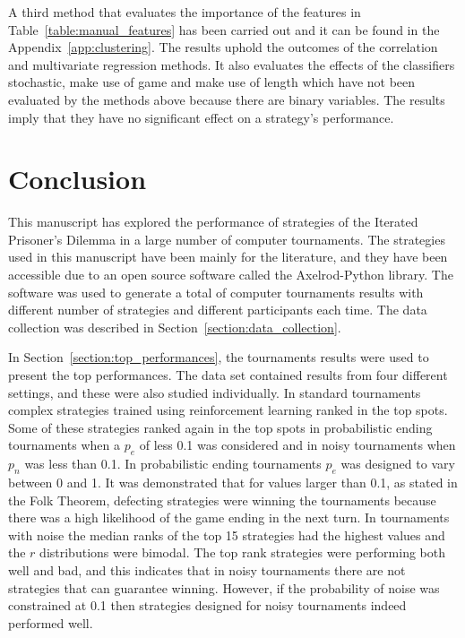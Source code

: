 \documentclass{article}
\newcommand{\numberofalltournaments}{}
\newcommand{\numberofstrategies}{}
\begin{document}
A third method that evaluates the importance of the features in
Table~\ref{table:manual_features} has been carried out and it can be found in
the Appendix~\ref{app:clustering}. The results uphold the outcomes of the
correlation and multivariate regression methods. It also evaluates the effects
of the classifiers stochastic, make use of game and make use of length which
have not been evaluated by the methods above because there are binary variables.
The results imply that they have no significant effect on a strategy's
performance.

\section{Conclusion}\label{section:conclusion}

This manuscript has explored the performance of \numberofstrategies strategies
of the Iterated Prisoner's Dilemma in a large number of computer tournaments.
The \numberofstrategies strategies used in this manuscript have been mainly for
the literature, and they have been accessible due to an open source software
called the Axelrod-Python library. The software was used to generate a total of
\numberofalltournaments computer tournaments results with different number of
strategies and different participants each time. The data collection was
described in Section~\ref{section:data_collection}.

In
Section~\ref{section:top_performances}, the tournaments results were used to
present the top performances. The data set contained results from four different
settings, and these were also studied individually. In standard tournaments
complex strategies trained using reinforcement learning ranked in the top spots.
Some of these strategies ranked again in the top spots in probabilistic
ending tournaments when a \(p_e\) of less 0.1 was considered and in noisy tournaments
when \(p_n\) was less than 0.1. In probabilistic
ending tournaments \(p_e\) was designed to vary between 0 and 1. It was demonstrated
that for values larger than 0.1, as stated in the Folk Theorem, defecting strategies
were winning the tournaments because there was a high likelihood of the game
ending in the next turn. In tournaments with noise the median ranks of the top
15 strategies had the highest values and the \(r\) distributions were bimodal.
The top rank strategies were performing both well and bad, and this indicates
that in noisy tournaments there are not strategies that can guarantee winning.
However, if the probability of noise was constrained at 0.1 then strategies
designed for noisy tournaments indeed performed well.
\end{document}
